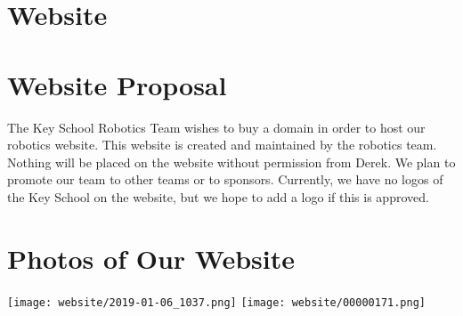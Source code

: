 \documentclass[12pt]{article}
\begin{document}
\section*{Website}

\section{Website Proposal}
The Key School Robotics Team wishes to buy a domain in order to host our robotics website. This website is created and maintained by the robotics team. Nothing will be placed on the website without permission from Derek. We plan to promote our team to other teams or to sponsors. Currently, we have no logos of the Key School on the website, but we hope to add a logo if this is approved.

\section{Photos of Our Website}
\texttt{[image: website/2019-01-06\_1037.png]}
\texttt{[image: website/00000171.png]}
\end{document}
